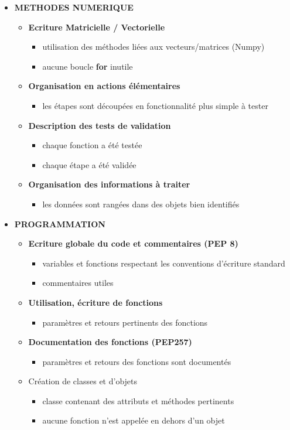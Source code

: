 \documentclass[10pt]{article} %
\begin{document}
\begin{itemize}
	\item \textbf{METHODES NUMERIQUE}
	\begin{itemize}
		\item \textbf{Ecriture Matricielle / Vectorielle}
		\begin{itemize}
			\item utilisation des méthodes liées aux vecteurs/matrices (Numpy)
			\item aucune boucle \textbf{for} inutile
		\end{itemize}		 
		\item \textbf{Organisation en actions élémentaires}
		\begin{itemize}
			\item les étapes sont découpées en fonctionnalité plus simple à tester
		\end{itemize}
		\item \textbf{Description des tests de validation}
		\begin{itemize}
			\item chaque fonction a été testée
			\item chaque étape a été validée
		\end{itemize}
		\item \textbf{Organisation des informations à traiter}
		\begin{itemize}
			\item les données sont rangées dans des objets bien identifiés
		\end{itemize}
	\end{itemize}


	\item \textbf{PROGRAMMATION}
	\begin{itemize}
		\item \textbf{Ecriture globale du code et commentaires (PEP 8)}
		\begin{itemize}
			\item variables et fonctions respectant les conventions d'écriture standard
			\item commentaires utiles
		\end{itemize}		 
		\item \textbf{Utilisation, écriture de fonctions}
		\begin{itemize}
			\item paramètres et retours pertinents des fonctions
		\end{itemize}
		\item \textbf{Documentation des fonctions (PEP257)}
		\begin{itemize}
			\item paramètres et retours des fonctions sont documentés
		\end{itemize}
		\item Création de classes et d'objets
		\begin{itemize}
			\item classe contenant des attributs et méthodes pertinents
			\item aucune fonction n'est appelée en dehors d'un objet
		\end{itemize}
	\end{itemize}
	


\end{itemize}
\end{document}
